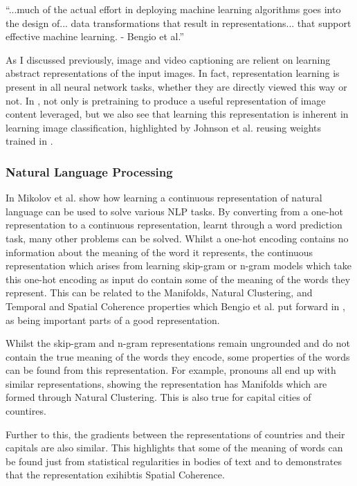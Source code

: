 \begin{displayquote}
``...much of the actual effort in deploying machine learning algorithms goes into the design of... data transformations that result in representations... that support effective machine learning. - Bengio et al.''
\end{displayquote}

As I discussed previously, image and video captioning are relient on learning abstract representations of the input images. In fact, representation learning is present in all neural network tasks, whether they are directly viewed this way or not. In \cite{vinyals2015show, venugopalan2014translating, johnson2016densecap}, not only is pretraining to produce a useful representation of image content leveraged, but we also see that learning this representation is inherent in learning image classification, highlighted by Johnson et al. \cite{johnson2016densecap} reusing weights trained in \cite{simonyan2014very}. 

\subsubsection{Natural Language Processing}
In \cite{mikolov2013distributed, mikolov2013efficient, mikolov2013linguistic} Mikolov et al. show how learning a continuous representation of natural language can be used to solve various \ac{NLP} tasks. By converting from a one-hot representation to a continuous representation, learnt through a word prediction task, many other problems can be solved. 
Whilst a one-hot encoding contains no information about the meaning of the word it represents, the continuous representation which arises from learning skip-gram or n-gram models which take this one-hot encoding as input do contain some of the meaning of the words they represent. This can be related to the Manifolds, Natural Clustering, and Temporal and Spatial Coherence properties which Bengio et al. put forward in  \cite{repRev}, as being important parts of a good representation.

Whilst the skip-gram and n-gram representations remain ungrounded and do not contain the true meaning of the words they encode, some properties of the words can be found from this representation. For example, pronouns all end up with similar representations, showing the representation has Manifolds which are formed through Natural Clustering. This is also true for capital cities of countires. 

Further to this, the gradients between the representations of countries and their capitals are also similar. This highlights that some of the meaning of words can be found just from statistical regularities in bodies of text and to demonstrates that the representation exihibtis Spatial Coherence.


